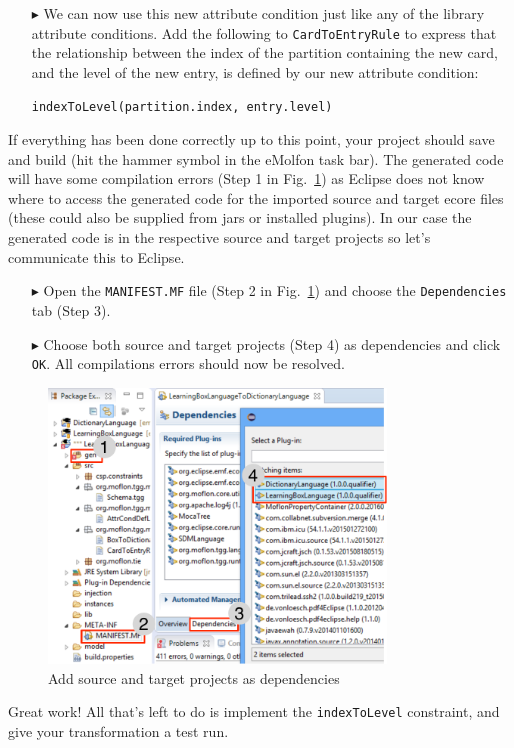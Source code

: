 \begin{enumerate}
\item[$\blacktriangleright$] We can now use this new attribute condition just like any of the library attribute conditions.
Add the following to \texttt{CardToEntryRule} to express that the relationship between the index of the partition containing the new card, and the level of the new entry, is defined by our new attribute condition:

\verb|indexToLevel(partition.index, entry.level)|
\end{enumerate}

If everything has been done correctly up to this point, your project should save and build (hit the hammer symbol in the eMolfon task bar).
The generated code will have some compilation errors (Step 1 in Fig.~\ref{eclipse:tggGenerated}) as Eclipse does not know where to access the generated code for the imported source and target ecore files (these could also be supplied from jars or installed plugins).
In our case the generated code is in the respective source and target projects so let's communicate this to Eclipse.

\begin{enumerate}

\item[$\blacktriangleright$] Open the \texttt{MANIFEST.MF} file (Step 2 in Fig.~\ref{eclipse:tggGenerated}) and choose the \texttt{De\-pen\-den\-cies} tab (Step 3).

\item[$\blacktriangleright$] Choose both source and target projects (Step 4) as dependencies and click \texttt{OK}.
All compilations errors should now be resolved.
\end{enumerate}

\begin{figure}[htb]
\begin{center}
  \includegraphics[width=0.8\textwidth]{eclipse_generatedTGG}
  \caption{Add source and target projects as dependencies}
  \label{eclipse:tggGenerated}
\end{center}
\end{figure}

Great work! All that's left to do is implement the \texttt{indexToLevel} constraint, and give your transformation a test run.

